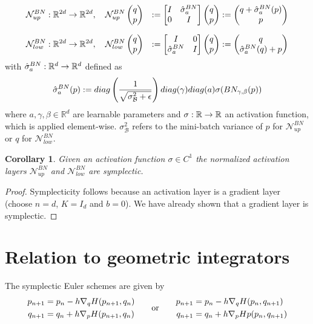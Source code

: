 \documentclass[twoside,a4paper]{article}
\newtheorem{corollary}{Corollary}
\begin{document}
\begin{alignat*}{2}
	\mathcal{N}^{BN}_{up} &: \mathbb{R}^{2d} \to \mathbb{R}^{2d}, \quad
	\mathcal{N}^{BN}_{up} \qpvec &:= \uppersympop{\hat{\activation}^{BN}_a} := \begin{pmatrix}
		q + \hat{\activation}^{BN}_a(p) \\
		p
	\end{pmatrix} \\[7pt]
	\mathcal{N}^{BN}_{low} &: \mathbb{R}^{2d} \to \mathbb{R}^{2d}, \quad
	\mathcal{N}^{BN}_{low} \qpvec &:= \lowersympop{\hat{\activation}^{BN}_a} := \begin{pmatrix}
		q \\
		\hat{\activation}^{BN}_a(q) + p
	\end{pmatrix}
\end{alignat*}
with $\hat{\activation}^{BN}_a : \mathbb{R}^d \to \mathbb{R}^d$ defined as
\begin{equation*}
	\hat{\activation}^{BN}_a(p) := 
	diag\lb \frac{1}{\sqrt{\sigma^2_\mathcal{B} + \epsilon}} \rb diag(\gamma)
	diag(a) \activation(BN_{\gamma, \beta}(p))
\end{equation*}
where $a, \gamma, \beta \in \mathbb{R}^d$ are learnable parameters and 
$\activation : \mathbb{R} \to \mathbb{R}$ an activation function,
which is applied element-wise. $\sigma^2_\mathcal{B}$ refers to the mini-batch variance of $p$
for $\mathcal{N}^{BN}_{up}$ or $q$ for $\mathcal{N}^{BN}_{low}$.

\begin{corollary}
	Given an activation function $\sigma \in C^1$
	the normalized activation layers $\mathcal{N}^{BN}_{up}$ and $\mathcal{N}^{BN}_{low}$
	are symplectic.
\end{corollary}
\begin{proof}
	Symplecticity follows because an activation layer is a gradient layer
	(choose $n=d$, $K=I_d$ and $b=0$). We have already shown that a gradient layer is symplectic.
\end{proof}

\section{Relation to geometric integrators}

The symplectic Euler schemes are given by
\begin{equation*}
	\begin{split}
			p_{n+1} &= p_n - h \grad[q]{H} (p_{n+1}, q_n) \\
			q_{n+1} &= q_n + h \grad[p]{H}(p_{n+1}, q_n)	
	\end{split}
	\quad\quad \text{or} \quad\quad
	\begin{split}
			p_{n+1} &= p_n - h \grad[q]{H}(p_n, q_{n+1}) \\
			q_{n+1} &= q_n + h \grad[p]{H}{p}(p_n, q_{n+1})	
	\end{split}
\end{equation*}
\end{document}
